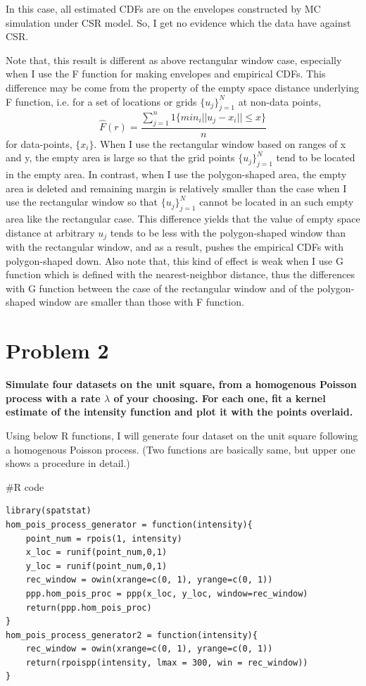\documentclass{article}
\newenvironment{Rcode}%
{%
    \begin{mdframed}
    \#R code
    \begin{small}
}
{%
    \end{small}
    \end{mdframed}
}
\begin{document}
In this case, all estimated CDFs are on the envelopes constructed by MC simulation under CSR model.
So, I get no evidence which the data have against CSR.

Note that, this result is different as above rectangular window case,
especially when I use the F function for making envelopes and empirical CDFs.
This difference may be come from the property of the empty space distance
underlying F function, i.e. for a set of locations or grids $\{u_j\}_{j=1}^{N}$ at non-data points,
\[\hat{F}(r) = \frac{\sum_{j=1}^{n} 1\{min_{i} ||u_j - x_i||\leq x\}}{n}\]
for data-points, $\{x_i\}$.
When I use the rectangular window based on ranges of x and y,
the empty area is large so that the grid points $\{u_j\}_{j=1}^{N}$ tend to
be located in the empty area. In contrast, when I use the polygon-shaped area,
the empty area is deleted and remaining margin is relatively smaller than the case when I use the rectangular window
so that $\{u_j\}_{j=1}^{N}$ cannot be located in an such empty area like the rectangular case.
This difference yields that the value of empty space distance at arbitrary $u_j$ tends to be less with the polygon-shaped window
than with the rectangular window, and as a result, pushes the empirical CDFs with polygon-shaped down.
Also note that, this kind of effect is weak when I use G function which is defined with the nearest-neighbor distance,
thus the differences with G function between the case of the rectangular window and of the polygon-shaped window are smaller
than those with F function.



\clearpage
\section{Problem 2}
\textbf{
Simulate four datasets on the unit square, from a homogenous Poisson process with a rate $\lambda$ of your choosing.
For each one, fit a kernel estimate of the intensity function and plot it with the points overlaid.
}

Using below R functions, I will generate four dataset on the unit square following a homogenous Poisson process.
(Two functions are basically same, but upper one shows a procedure in detail.)

\begin{Rcode}
    \begin{verbatim}
library(spatstat)
hom_pois_process_generator = function(intensity){
    point_num = rpois(1, intensity)
    x_loc = runif(point_num,0,1)
    y_loc = runif(point_num,0,1)
    rec_window = owin(xrange=c(0, 1), yrange=c(0, 1))
    ppp.hom_pois_proc = ppp(x_loc, y_loc, window=rec_window)
    return(ppp.hom_pois_proc)
}
hom_pois_process_generator2 = function(intensity){
    rec_window = owin(xrange=c(0, 1), yrange=c(0, 1))
    return(rpoispp(intensity, lmax = 300, win = rec_window))
}
    \end{verbatim}
\end{Rcode}
\end{document}
